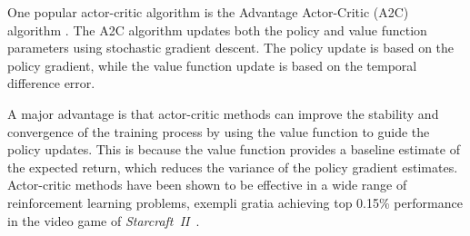 One popular actor-critic algorithm is the Advantage Actor-Critic (A2C) algorithm \autocite{mnih2016}.
The A2C algorithm updates both the policy and value function parameters using stochastic gradient descent.
The policy update is based on the policy gradient, while the value function update is based on the temporal difference error.

A major advantage is that actor-critic methods can improve the stability and convergence of the training process by using the value function to guide the policy updates.
This is because the value function provides a baseline estimate of the expected return, which reduces the variance of the policy gradient estimates.
Actor-critic methods have been shown to be effective in a wide range of reinforcement learning problems, exempli gratia achieving top 0.15\% performance in the video game of \textit{Starcraft~II}~\autocite{vinyals2019}.